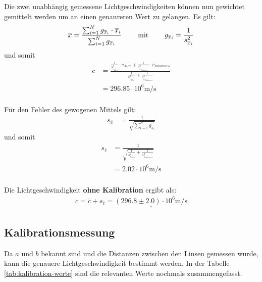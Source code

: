 Die  zwei  unabh\"angig gemessene Lichtgeschwindigkeiten k\"onnen nun  gewichtet
gemittelt werden um an einen genaureren Wert zu gelangen. Es gilt:
\begin{align*}
    \overline{x}  &= \frac{\sum_{i=1}^{N} g_{\overline{x}_i} \cdot \overline{x}_i}{\sum_{i=1}^{N} g_{\overline{x}_i}} \hspace{8mm}\textrm{mit}\hspace{8mm} g_{\overline{x}_i} = \frac{1}{s^2_{\overline{x}_i}} \\
\end{align*}
und somit
\begin{align*}
    \overline{c}  &= \frac{ \frac{1}{s_{\overline{c_{Alex}}}^2} \cdot \overline{c_{Alex}} + \frac{1}{s_{\overline{c_{Yohannes}}}^2} \cdot \overline{c_{Yohannes}} }
                          { \frac{1}{s_{\overline{c_{Alex}}}^2} + \frac{1}{s_{\overline{c_{Yohannes}}}^2} } \\
                  &= 296.85 \cdot 10^6 \textrm{m}/\textrm{s} \\
\end{align*}

F\"ur den Fehler des gewogenen Mittels gilt:
\begin{align*}
    s_{\overline{x}} &= \frac{1}{\sqrt{\sum_{i=1}^{N} g_{\overline{x}_i}}}
\end{align*}
und somit
\begin{align*}
    s_{\overline{c}} &= \frac{1}{ \sqrt{\frac{1}{s_{\overline{c_{Alex}}}^2} + \frac{1}{s_{\overline{c_{Yohannes}}}^2}}} \\
                     &= 2.02 \cdot 10^6 \textrm{m}/\textrm{s} \\
\end{align*}

Die Lichtgeschwindigkeit \textbf{ohne Kalibration} ergibt als:
\begin{align*}
    c = \overline{c} + s_{\overline{c}} = \underline{\underline{(296.8 \pm 2.0) \cdot 10^6 \textrm{m}/\textrm{s}}}
\end{align*}


\subsection{Kalibrationsmessung}

Da  $a$  und  $b$ bekannt sind und die Distanzen zwischen  den  Linsen  gemessen
wurde,  kann  die genauere Lichtgeschwindigkeit bestimmt werden. In der  Tabelle
\ref{tab:kalibration-werte} sind die relevanten Werte nochmals  zusammengefasst.

